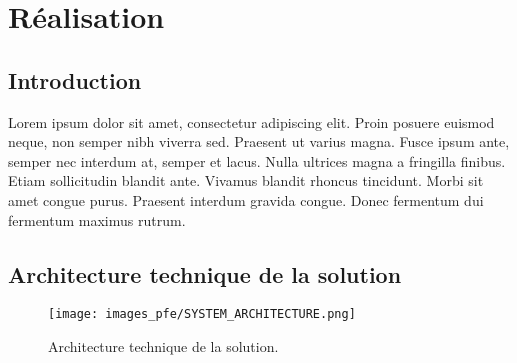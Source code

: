 \chapter{Réalisation}

\newpage

\section{Introduction}
Lorem ipsum dolor sit amet, consectetur adipiscing elit. Proin posuere euismod neque, non semper nibh viverra sed. Praesent ut varius magna. Fusce ipsum ante, semper nec interdum at, semper et lacus. Nulla ultrices magna a fringilla finibus. Etiam sollicitudin blandit ante. Vivamus blandit rhoncus tincidunt. Morbi sit amet congue purus. Praesent interdum gravida congue. Donec fermentum dui fermentum maximus rutrum.

\section{Architecture technique de la solution}

\begin{figure}[hbt!]
  \centering
  \texttt{[image: images\_pfe/SYSTEM\_ARCHITECTURE.png]}
  \caption{Architecture technique de la solution.}
  \label{fig:technical-architecture}
\end{figure}
\FloatBarrier

